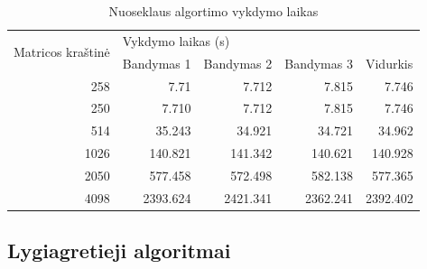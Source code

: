 \documentclass{VUMIFPSbakalaurinis}
\begin{document}
\begin{table}[]
    \begin{tabular}{|r|rrrr|}
        \hline
        \multicolumn{1}{|l|}{\multirow{2}{*}{Matricos kraštinė}} & \multicolumn{4}{l|}{Vykdymo laikas (s)}                                                                                                     \\ \cline{2-5}
        \multicolumn{1}{|l|}{}                                   & \multicolumn{1}{l|}{Bandymas 1}         & \multicolumn{1}{l|}{Bandymas 2} & \multicolumn{1}{l|}{Bandymas 3} & \multicolumn{1}{l|}{Vidurkis} \\ \hline        258                                                      & \multicolumn{1}{r|}{7.71}               & \multicolumn{1}{r|}{7.712}                     & \multicolumn{1}{r|}{7.815}      & 7.746                         \\ \hline
        250                                                      & \multicolumn{1}{r|}{7.710}              & \multicolumn{1}{r|}{7.712}      & \multicolumn{1}{r|}{7.815}      & 7.746                         \\ \hline
        514                                                      & \multicolumn{1}{r|}{35.243}             & \multicolumn{1}{r|}{34.921}     & \multicolumn{1}{r|}{34.721}     & 34.962                        \\ \hline
        1026                                                     & \multicolumn{1}{r|}{140.821}            & \multicolumn{1}{r|}{141.342}    & \multicolumn{1}{r|}{140.621}    & 140.928                       \\ \hline
        2050                                                     & \multicolumn{1}{r|}{577.458}            & \multicolumn{1}{r|}{572.498}    & \multicolumn{1}{r|}{582.138}    & 577.365                       \\ \hline
        4098                                                     & \multicolumn{1}{r|}{2393.624}           & \multicolumn{1}{r|}{2421.341}   & \multicolumn{1}{r|}{2362.241}   & 2392.402                      \\ \hline
    \end{tabular}
    \caption{Nuoseklaus algortimo vykdymo laikas}
    \label{table:seq_time}
\end{table}


\subsection{Lygiagretieji algoritmai}
\end{document}
